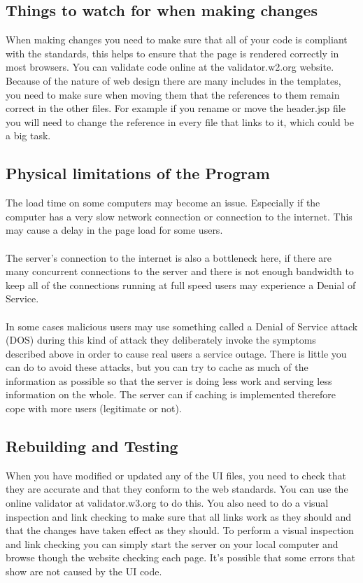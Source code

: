 \documentclass[titlepage]{article}
\begin{document}
{\subsection {Things to watch for when making changes}
When making changes you need to make sure that all of your code is compliant with the standards, this helps to ensure that the page is rendered correctly in most browsers. You can validate code online at the validator.w2.org website.
\\
Because of the nature of web design there are many includes in the templates, you need to make sure when moving them that the references to them remain correct in the other files. For example if you rename or move the header.jsp file you will need to change the reference in every file that links to it, which could be a big task.
\subsection {Physical limitations of the Program}
The load time on some computers may become an issue. Especially if the computer has a very slow network connection or connection to the internet. This may cause a delay in the page load for some users.
\\
\\
The server’s connection to the internet is also a bottleneck here, if there are many concurrent connections to the server and there is not enough bandwidth to keep all of the connections running at full speed users may experience a Denial of Service.
\\
\\
In some cases malicious users may use something called a Denial of Service attack (DOS) during this kind of attack they deliberately invoke the symptoms described above in order to cause real users a service outage. There is little you can do to avoid these attacks, but you can try to cache as much of the information as possible so that the server is doing less work and serving less information on the whole. The server can if caching is implemented therefore cope with more users (legitimate or not).
\subsection{Rebuilding and Testing}
When you have modified or updated any of the UI files, you need to check that they are accurate and that they conform to the web standards. You can use the online validator at validator.w3.org to do this. You also need to do a visual inspection and link checking to make sure that all links work as they should and that the changes have taken effect as they should. To perform a visual inspection and link checking you can simply start the server on your local computer and browse though the website checking each page. It’s possible that some errors that show are not caused by the UI code.
}
\end{document}
